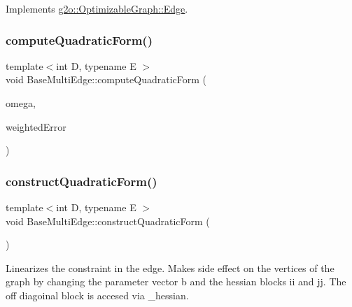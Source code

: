 Implements \mbox{\hyperlink{classg2o_1_1_optimizable_graph_1_1_edge_a414c69ca1617a4d3b620e39f2ffbcea7}{g2o\+::\+Optimizable\+Graph\+::\+Edge}}.

\mbox{\label{classg2o_1_1_base_multi_edge_ac260b65c12f6594165af680f815ac291}} 
\subsubsection{\texorpdfstring{compute\+Quadratic\+Form()}{computeQuadraticForm()}}
{\footnotesize\ttfamily template$<$int D, typename E $>$ \\
void Base\+Multi\+Edge\+::compute\+Quadratic\+Form (\begin{DoxyParamCaption}\item[{const \mbox{\hyperlink{classg2o_1_1_base_edge_a2e5a33343ac3f189d8a7d5ee4d8b73fc}{Information\+Type}} \&}]{omega,  }\item[{const \mbox{\hyperlink{classg2o_1_1_base_edge_af5b558dd24e4be2e437563cae4b3550d}{Error\+Vector}} \&}]{weighted\+Error }\end{DoxyParamCaption})\hspace{0.3cm}{\ttfamily [protected]}}

\mbox{\label{classg2o_1_1_base_multi_edge_ae44ba0385d4dda4bc038d81e50cadd8c}} 
\subsubsection{\texorpdfstring{construct\+Quadratic\+Form()}{constructQuadraticForm()}}
{\footnotesize\ttfamily template$<$int D, typename E $>$ \\
void Base\+Multi\+Edge\+::construct\+Quadratic\+Form (\begin{DoxyParamCaption}{ }\end{DoxyParamCaption})\hspace{0.3cm}{\ttfamily [virtual]}}

Linearizes the constraint in the edge. Makes side effect on the vertices of the graph by changing the parameter vector b and the hessian blocks ii and jj. The off diagoinal block is accesed via \+\_\+hessian. 

